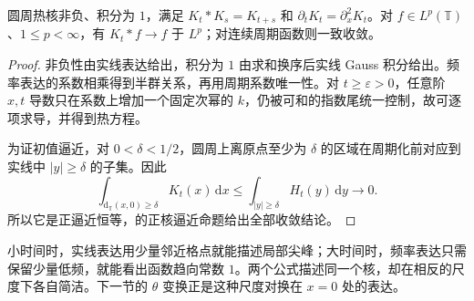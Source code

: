 \begin{proposition}\label{b2:prop:06-heat-kernel}
圆周热核非负、积分为 \(1\)，满足 \(K_t*K_s=K_{t+s}\) 和 \(\partial_tK_t=\partial_x^2K_t\)。对 \(f\in L^p(\mathbb T)\)、\(1\leq p<\infty\)，有 \(K_t*f\to f\) 于 \(L^p\)；对连续周期函数则一致收敛。
\end{proposition}
\begin{proof}
非负性由实线表达给出，积分为 \(1\) 由求和换序后实线 Gauss 积分给出。频率表达的系数相乘得到半群关系，再用周期系数唯一性。对 \(t\geq\varepsilon>0\)，任意阶 \(x,t\) 导数只在系数上增加一个固定次幂的 \(k\)，仍被可和的指数尾统一控制，故可逐项求导，并得到热方程。

为证初值逼近，对 \(0<\delta<1/2\)，圆周上离原点至少为 \(\delta\) 的区域在周期化前对应到实线中 \(|y|\geq\delta\) 的子集。因此
\[
 \int_{\mathrm{d}_{\mathbb T}(x,0)\geq\delta}K_t(x)\,\mathrm{d}x
 \leq\int_{|y|\geq\delta}H_t(y)\,\mathrm{d}y\longrightarrow0.
\]
所以它是正逼近恒等，的正核逼近命题给出全部收敛结论。
\end{proof}

小时间时，实线表达用少量邻近格点就能描述局部尖峰；大时间时，频率表达只需保留少量低频，就能看出函数趋向常数 \(1\)。两个公式描述同一个核，却在相反的尺度下各自简洁。下一节的 \(\theta\) 变换正是这种尺度对换在 \(x=0\) 处的表达。
